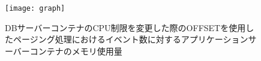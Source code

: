 \documentclass[../../../../../main]{subfiles}
\begin{document}
    \begin{figure}[H]
        \centering
        \texttt{[image: graph]}
        \caption{DBサーバーコンテナのCPU制限を変更した際のOFFSETを使用したページング処理におけるイベント数に対するアプリケーションサーバーコンテナのメモリ使用量}
        \label{fig:paging-offset-change-db-cpu-limit-app-memory-app_4_8192-db_1024}
    \end{figure}
\end{document}
